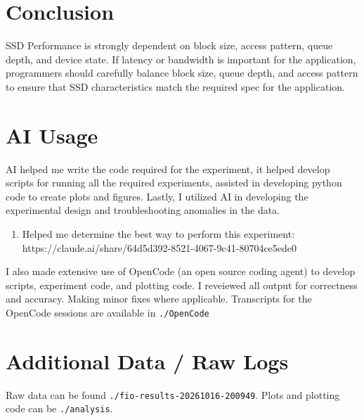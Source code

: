 \documentclass[11pt]{article}
\begin{document}
\section{Conclusion}

SSD Performance is strongly dependent on block size, access pattern, queue depth, and device state. If latency or
bandwidth is important for the application, programmers should carefully balance block size, queue depth, and access
pattern to ensure that SSD characteristics match the required spec for the application.

\appendix

\section{AI Usage}

AI helped me write the code required for the experiment, it helped develop scripts for running all the required
experiments, assisted in developing python code to create plots and figures. Lastly, I utilized AI in developing the
experimental design and troubleshooting anomalies in the data.

\begin{enumerate}
	\item Helped me determine the best way to perform this experiment:
	      https://claude.ai/share/64d5d392-8521-4067-9c41-80704ce5ede0
\end{enumerate}

I also made extensive use of OpenCode (an open source coding agent) to develop scripts, experiment code, and plotting
code. I reveiewed all output for correctness and accuracy. Making minor fixes where applicable. Transcripts for the
OpenCode sessions are available in \texttt{./OpenCode}

\section{Additional Data / Raw Logs}
Raw data can be found \texttt{./fio-results-20261016-200949}. Plots and plotting code can be \texttt{./analysis}.


\end{document}
